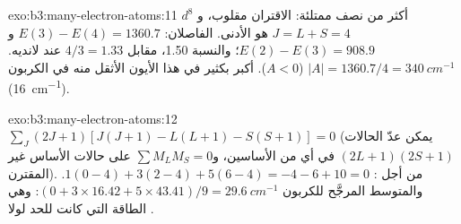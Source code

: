 \begin{solution}{exo:b3:many-electron-atoms:11}
$d^8$ أكثر من نصف ممتلئة: الاقتران مقلوب، و$J = L + S = 4$
هو الأدنى. الفاصلان: $E(3) - E(4) = 1360.7$ و$E(2) - E(3) = 908.9$؛ والنسبة
1.50، مقابل $4/3 = 1.33$ عند لانديه. $|A| = 1360.7/4 = \qty{340}{cm^{-1}}$
($A < 0$).  أكبر بكثير في هذا الأيون الأثقل منه في
الكربون (\qty{16}{cm^{-1}}).
\end{solution}

\begin{solution}{exo:b3:many-electron-atoms:12}
$\sum_J(2J+1)[J(J+1) - L(L+1) - S(S+1)] = 0$ (يمكن عدّ الحالات $(2L+1)(2S+1)$
في أي من الأساسين، و$\sum M_LM_S = 0$ على حالات الأساس غير المقترن).
من أجل : $1(0 - 4) + 3(2 - 4) + 5(6 - 4) = -4 - 6 + 10 = 0$. والمتوسط
المرجَّح للكربون $(0 + 3 \times 16.42 + 5 \times 43.41)/9 = \qty{29.6}{cm^{-1}}$:
وهي الطاقة التي كانت للحد لولا .
\end{solution}

